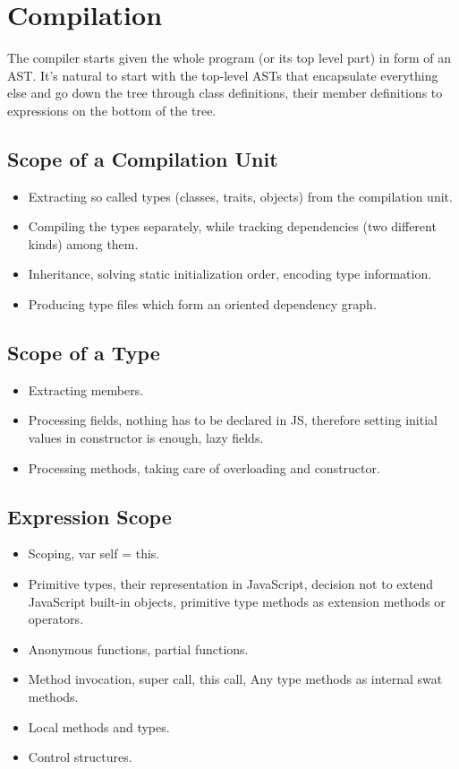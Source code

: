 \documentclass[12pt,a4paper]{report}
\begin{document}
\section{Compilation}

The compiler starts given the whole program (or its top level part) in form of an AST. It's natural to start with the top-level ASTs that encapsulate everything else and go down the tree through class definitions, their member definitions to expressions on the bottom of the tree.

\subsection{Scope of a Compilation Unit}

\begin{itemize}
\item Extracting so called types (classes, traits, objects) from the compilation unit.
\item Compiling the types separately, while tracking dependencies (two different kinds) among them.
\item Inheritance, solving static initialization order, encoding type information.
\item Producing type files which form an oriented dependency graph.
\end{itemize}

\subsection{Scope of a Type}

\begin{itemize}
\item Extracting members.
\item Processing fields, nothing has to be declared in JS, therefore setting initial values in constructor is enough, lazy fields.
\item Processing methods, taking care of overloading and constructor.
\end{itemize}

\subsection{Expression Scope}

\begin{itemize}
\item Scoping, var self = this.
\item Primitive types, their representation in JavaScript, decision not to extend JavaScript built-in objects, primitive type methods as extension methods or operators.
\item Anonymous functions, partial functions.
\item Method invocation, super call, this call, Any type methods as internal swat methods.
\item Local methods and types.
\item Control structures.
\end{itemize}
\end{document}
